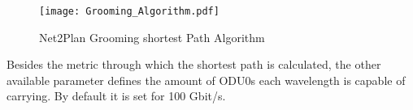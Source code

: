 	\vspace{0.5cm}
	\begin{figure}[h!]
		\centering
		\texttt{[image: Grooming\_Algorithm.pdf]}
		\caption{Net2Plan Grooming shortest Path Algorithm}
		\label{Grooming_Algorithm}
	\end{figure}	
	
	Besides the metric through which the shortest path is calculated, the other available parameter defines the amount of ODU0s each wavelength is capable of carrying. By default it is set for 100 Gbit/s.\\

	
		
	
	
	

